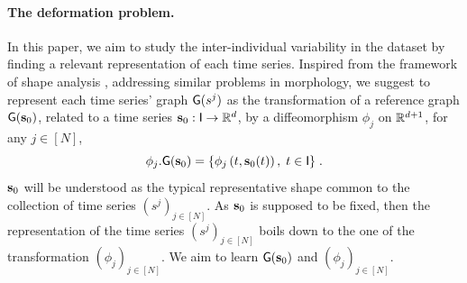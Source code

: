 \paragraph*{The deformation problem.}
In this paper, we aim to study the inter-individual variability in the dataset by finding a relevant representation of each time series.
Inspired from the framework of shape analysis \cite{vaillant2004statistics}, addressing similar problems in morphology,
 we suggest to represent each time series' graph $\mathsf{G}(s^j)$ as the transformation of a reference graph $\mathsf{G}(\mathbf{s}_0)$, related to a time series $\mathbf{s}_0:\mathsf{I} \to\mathbb{R}^d$, by a diffeomorphism $\phi_j$ on $\mathbb{R}^{d+1}$, for any $j\in[N]$,
\begin{equation}
 \label{eq:transformation}
 \phi_j.\mathsf{G}(\mathbf{s}_0)=\{\phi_j\left(t,\mathbf{s}_0(t)\right), \; t\in \mathsf{I} \} \;.
\end{equation}
$\mathbf{s}_0$ will be understood as the typical representative shape common to the collection of time series $(s^j)_{j\in[N]}$.
As $\mathbf{s}_0$ is supposed to be fixed, then the representation of the time series $(s^j)_{j\in[N]}$ boils down to the one of the transformation $(\phi_j)_{j\in[N]}$.
We aim to learn $\mathsf{G}(\mathbf{s}_0)$ and $(\phi_j)_{j\in[N]} $. 

 
 
     \vspace{-1ex}
